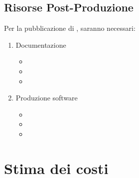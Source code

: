 \subsection{Risorse Post-Produzione}
Per la pubblicazione di \ProjectTitle{}, saranno necessari:
\begin{enumerate}
	\item Documentazione
	\begin{itemize}
		\item 
		\item 
		\item 
	\end{itemize}
	\item Produzione software
	\begin{itemize}
		\item 
		\item 
		\item 
	\end{itemize}
\end{enumerate}

\section{Stima dei costi}

